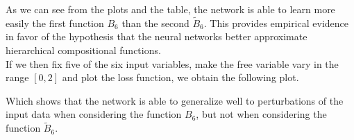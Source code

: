 As we can see from the plots and the table, the network is able to learn
more easily the first function $B_6$ than the second $\tilde{B}_6$.
This provides empirical evidence in favor of the hypothesis that the
neural networks better approximate hierarchical compositional
functions. \\

If we then fix five of the six input variables, make the free variable
vary in the range $[0, 2]$ and plot the loss function, we obtain the following
plot.


Which shows that the network is able to generalize well to perturbations
of the input data when considering the function $B_6$, but not when
considering the function $\tilde{B}_6$.